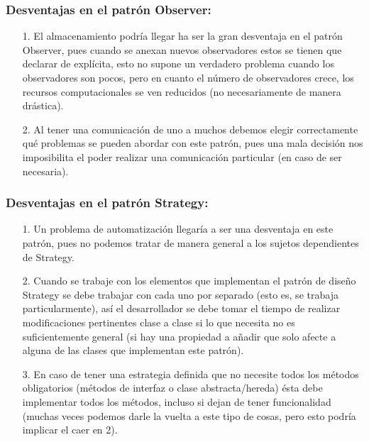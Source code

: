 \documentclass{article}
\begin{document}
\subsubsection*{Desventajas en el patrón Observer:}
\begin{itemize}
\item[1.] El almacenamiento podría llegar ha ser la gran desventaja en el patrón Observer, pues cuando se anexan nuevos observadores estos se tienen que declarar de explícita, esto no supone un verdadero problema cuando los observadores son pocos, pero en cuanto el número de observadores crece, los recursos computacionales se ven reducidos (no necesariamente de manera drástica).
\item[2.] Al tener una comunicación de uno a muchos debemos elegir correctamente qué problemas se pueden abordar con este patrón, pues una mala decisión nos imposibilita el poder realizar una comunicación particular (en caso de ser necesaria).
\end{itemize}

\subsubsection*{Desventajas en el patrón Strategy:}
\begin{itemize}
\item[1.] Un problema de automatización llegaría a ser una desventaja en este patrón, pues no podemos tratar de manera general a los sujetos dependientes de Strategy.
\item[2.] Cuando se trabaje con los elementos que implementan el patrón de diseño Strategy se debe trabajar con cada uno por separado (esto es, se trabaja particularmente), así el desarrollador se debe tomar el tiempo de realizar modificaciones pertinentes clase a clase si lo que necesita no es suficientemente general (si hay una propiedad a añadir que solo afecte a alguna de las clases que implementan este patrón).
\item[3.] En caso de tener una estrategia definida que no necesite todos los métodos obligatorios (métodos de interfaz o clase abstracta/hereda) ésta debe implementar todos los métodos, incluso si dejan de tener funcionalidad (muchas veces podemos darle la vuelta a este tipo de cosas, pero esto podría implicar el caer en 2).
\end{itemize}
\end{document}
